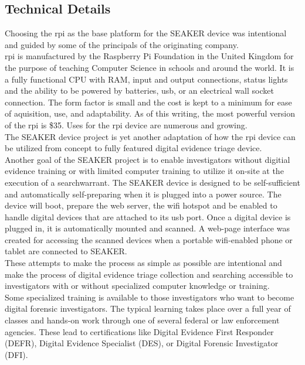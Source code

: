 \documentclass[12pt]{article}
\begin{document}
\subsection{Technical Details}

Choosing the \gls{rpi} as the base platform for the SEAKER device was intentional
and guided by some of the principals of the originating company.\\

\gls{rpi} is manufactured by the Raspberry Pi Foundation in the United Kingdom
for the purpose of teaching Computer Science in schools and around the world.  It
is a fully functional CPU with RAM, input and output connections, status lights
and the ability
to be powered by batteries, \gls{usb}, or an electrical wall socket connection.
The form factor is small and the cost is kept to a minimum for ease of
aquisition, use, and adaptability.  As of this writing,
the most powerful version of the \gls{rpi} is \$35.  Uses for the \gls{rpi}
device are numerous and growing.\\

The SEAKER device project is yet another adaptation of how the \gls{rpi} device
can be utilized from concept to fully featured digital evidence triage device.\\

Another goal of the SEAKER project is to enable investigators without 
digitial evidence training or with limited computer training to utilize it
on-site at the execution of a \gls{searchwarrant}.  The SEAKER device is designed to
be self-sufficient and automatically self-preparing when it is plugged into a 
power source.  The device will boot, prepare the web server, the \gls{wifi} hotspot
and be enabled to handle digital devices that are attached to its \gls{usb} port.
Once a digital device is plugged in, it is automatically mounted and scanned.
A web-page interface was created for accessing the scanned devices when a portable
\gls{wifi}-enabled phone or tablet are connected to SEAKER.\\

These attempts to make the process as simple as possible are intentional and 
make the process of digital evidence triage collection and searching accessible
to investigators with or without specialized computer knowledge or training.\\

Some specialized training is available to those investigators who want to 
become digital forensic investigators.  The typical learning takes place over
a full year of classes and hands-on work through one of several federal or 
law enforcement agencies.  These lead to certifications like Digital Evidence
First Responder (DEFR), Digital Evidence Specialist (DES), or Digital Forensic
Investigator (DFI).\\
\end{document}
